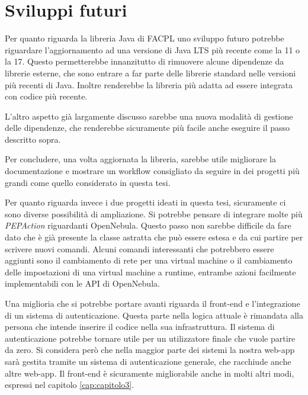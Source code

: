\section{Sviluppi futuri}
Per quanto riguarda la libreria Java di FACPL uno sviluppo futuro potrebbe riguardare l'aggiornamento ad una versione di Java LTS più recente come la 11 o la 17. Questo permetterebbe innanzitutto di rimuovere alcune dipendenze da librerie esterne, che sono entrare a far parte delle librerie standard nelle versioni più recenti di Java. Inoltre renderebbe la libreria più adatta ad essere integrata con codice più recente.\par
L'altro aspetto già largamente discusso sarebbe una nuova modalità di gestione delle dipendenze, che renderebbe sicuramente più facile anche eseguire il passo descritto sopra.\par
Per concludere, una volta aggiornata la libreria, sarebbe utile migliorare la documentazione e mostrare un workflow consigliato da seguire in dei progetti più grandi come quello considerato in questa tesi.\par
Per quanto riguarda invece i due progetti ideati in questa tesi, sicuramente ci sono diverse possibilità di ampliazione. Si potrebbe pensare di integrare molte più \emph{PEPAction} riguardanti OpenNebula. Questo passo non sarebbe difficile da fare dato che è già presente la classe astratta che può essere estesa e da cui partire per scrivere nuovi comandi. Alcuni comandi interessanti che potrebbero essere aggiunti sono il cambiamento di rete per una virtual machine o il cambiamento delle impostazioni di una virtual machine a runtime, entrambe azioni facilmente implementabili con le API di OpenNebula.\par

Una miglioria che si potrebbe portare avanti riguarda il front-end e l'integrazione di un sistema di autenticazione. Questa parte nella logica attuale è rimandata alla persona che intende inserire il codice nella sua infrastruttura. Il sistema di autenticazione potrebbe tornare utile per un utilizzatore finale che vuole partire da zero. Si considera però che nella maggior parte dei sistemi la nostra web-app sarà gestita tramite un sistema di autenticazione generale, che racchiude anche altre web-app. Il front-end è sicuramente migliorabile anche in molti altri modi, espressi nel capitolo \ref{cap:capitolo3}.\par